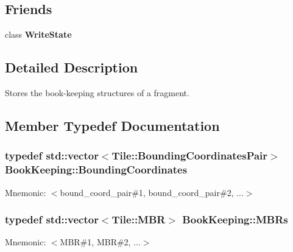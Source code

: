 \subsection*{Friends}
\begin{DoxyCompactItemize}
\item 
\hypertarget{classBookKeeping_aa4b41796e1fb4272f89a044f076395f5}{}class {\bfseries Write\+State}\label{classBookKeeping_aa4b41796e1fb4272f89a044f076395f5}

\end{DoxyCompactItemize}


\subsection{Detailed Description}
Stores the book-\/keeping structures of a fragment. 

\subsection{Member Typedef Documentation}
\hypertarget{classBookKeeping_a1eea369202e1cf25c837fbf64a210c4e}{}
\subsubsection[{Bounding\+Coordinates}]{\setlength{\rightskip}{0pt plus 5cm}typedef std\+::vector$<${\bf Tile\+::\+Bounding\+Coordinates\+Pair}$>$ {\bf Book\+Keeping\+::\+Bounding\+Coordinates}}\label{classBookKeeping_a1eea369202e1cf25c837fbf64a210c4e}
Mnemonic\+: $<$bound\+\_\+coord\+\_\+pair\#1, bound\+\_\+coord\+\_\+pair\#2, ...$>$ \hypertarget{classBookKeeping_a3c3be3ebbeab5f23248df738f4d1c897}{}
\subsubsection[{M\+B\+Rs}]{\setlength{\rightskip}{0pt plus 5cm}typedef std\+::vector$<${\bf Tile\+::\+M\+B\+R}$>$ {\bf Book\+Keeping\+::\+M\+B\+Rs}}\label{classBookKeeping_a3c3be3ebbeab5f23248df738f4d1c897}
Mnemonic\+: $<$M\+B\+R\#1, M\+B\+R\#2, ...$>$ \hypertarget{classBookKeeping_a0abbce3d062de307549f04c8426203c7}{}
